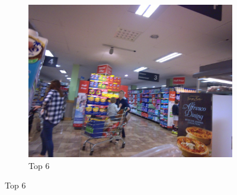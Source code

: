 \begin{figure}[H]
\begin{subfigure}{0.32\textwidth}
    \includegraphics[width=\textwidth]{Sections/7Results/images/top6.jpg}\hfill
    \caption{Top 6}
  \end{subfigure}\par\medskip


\end{figure}

